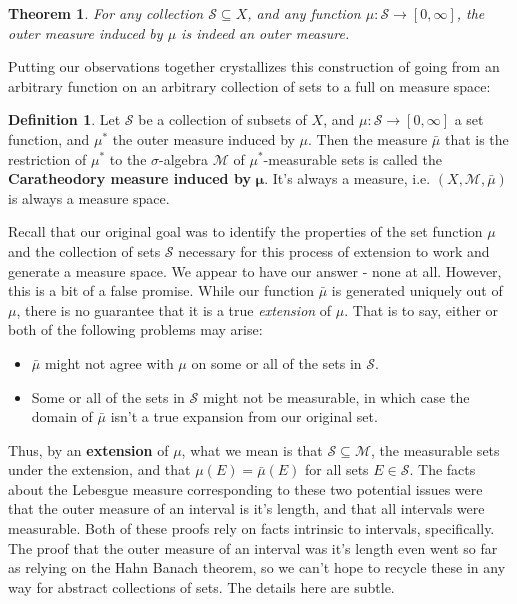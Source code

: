\documentclass{article}
\theoremstyle{definition}
\newtheorem{definition}{Definition}[section]
\theoremstyle{plain}
\theoremstyle{theorem}
\newtheorem{theorem}{Theorem}[section]
\begin{document}
\begin{theorem}
	For any collection $\mathcal{S} \subseteq X$, and any function $\mu:\mathcal{S} \to [0,\infty]$, the outer measure induced by $\mu$ is indeed an outer measure.
\end{theorem}
Putting our observations together crystallizes this construction of going from an arbitrary function on an arbitrary collection of sets to a full on measure space:
\begin{definition}
	Let $\mathcal{S}$ be a collection of subsets of $X$, and $\mu:\mathcal{S} \to [0,\infty]$ a set function, and $\mu^*$ the outer measure induced by $\mu$. Then the measure $\bar{\mu}$ that is the restriction of $\mu^*$ to the $\sigma$-algebra $\mathcal{M}$ of $\mu^*$-measurable sets is called the \textbf{Caratheodory measure induced by} $\bm{\mu}$. It's always a measure, i.e. $(X,\mathcal{M},\bar{\mu})$ is always a measure space.
\end{definition}
Recall that our original goal was to identify the properties of the set function $\mu$ and the collection of sets $\mathcal{S}$ necessary for this process of extension to work and generate a measure space. We appear to have our answer - none at all. However, this is a bit of a false promise. While our function $\bar{\mu}$ is generated uniquely out of $\mu$, there is no guarantee that it is a true \textit{extension} of $\mu$. That is to say, either or both of the following problems may arise:
\begin{itemize}
	\item[(1)] $\bar{\mu}$ might not agree with $\mu$ on some or all of the sets in $\mathcal{S}$. 
	\item[(2)] Some or all of the sets in $\mathcal{S}$ might not be measurable, in which case the domain of $\bar{\mu}$ isn't a true expansion from our original set.
\end{itemize}
Thus, by an \textbf{extension} of $\mu$, what we mean is that $\mathcal{S} \subseteq \mathcal{M}$, the measurable sets under the extension, and that $\mu(E) = \bar{\mu}(E)$ for all sets $E \in \mathcal{S}$. The facts about the Lebesgue measure corresponding to these two potential issues were that the outer measure of an interval is it's length, and that all intervals were measurable. Both of these proofs rely on facts intrinsic to intervals, specifically. The proof that the outer measure of an interval was it's length even went so far as relying on the Hahn Banach theorem, so we can't hope to recycle these in any way for abstract collections of sets. The details here are subtle. \par 
\end{document}
